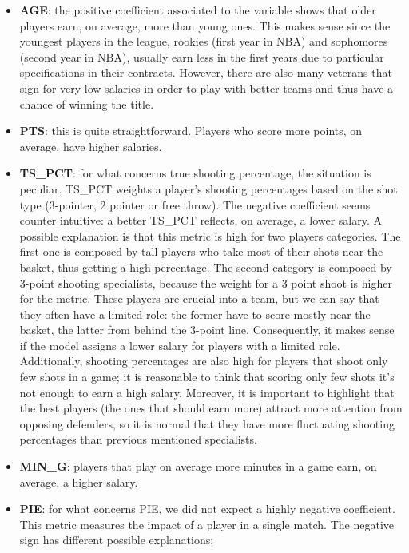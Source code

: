 \documentclass[
]{article}
\begin{document}
\begin{itemize}
\item
  \textbf{AGE}: the positive coefficient associated to the variable
  shows that older players earn, on average, more than young ones. This
  makes sense since the youngest players in the league, rookies (first
  year in NBA) and sophomores (second year in NBA), usually earn less in
  the first years due to particular specifications in their contracts.
  However, there are also many veterans that sign for very low salaries
  in order to play with better teams and thus have a chance of winning
  the title.
\item
  \textbf{PTS}: this is quite straightforward. Players who score more
  points, on average, have higher salaries.
\item
  \textbf{TS\_PCT}: for what concerns true shooting percentage, the
  situation is peculiar. TS\_PCT weights a player's shooting percentages
  based on the shot type (3-pointer, 2 pointer or free throw). The
  negative coefficient seems counter intuitive: a better TS\_PCT
  reflects, on average, a lower salary. A possible explanation is that
  this metric is high for two players categories. The first one is
  composed by tall players who take most of their shots near the basket,
  thus getting a high percentage. The second category is composed by
  3-point shooting specialists, because the weight for a 3 point shoot
  is higher for the metric. These players are crucial into a team, but
  we can say that they often have a limited role: the former have to
  score mostly near the basket, the latter from behind the 3-point line.
  Consequently, it makes sense if the model assigns a lower salary for
  players with a limited role. Additionally, shooting percentages are
  also high for players that shoot only few shots in a game; it is
  reasonable to think that scoring only few shots it's not enough to
  earn a high salary. Moreover, it is important to highlight that the
  best players (the ones that should earn more) attract more attention
  from opposing defenders, so it is normal that they have more
  fluctuating shooting percentages than previous mentioned specialists.
\item
  \textbf{MIN\_G}: players that play on average more minutes in a game
  earn, on average, a higher salary.
\item
  \textbf{PIE}: for what concerns PIE, we did not expect a highly
  negative coefficient. This metric measures the impact of a player in a
  single match. The negative sign has different possible explanations:

\end{itemize}
\end{document}
